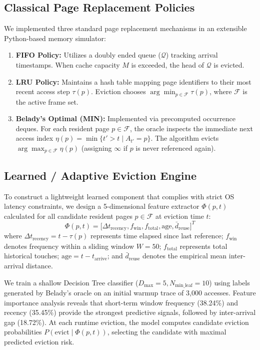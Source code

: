 \documentclass[10pt,twocolumn,a4paper]{article}
\begin{document}
\subsection{Classical Page Replacement Policies}
We implemented three standard page replacement mechanisms in an extensible Python-based memory simulator:
\begin{enumerate}
    \item \textbf{FIFO Policy:} Utilizes a doubly ended queue ($\mathcal{Q}$) tracking arrival timestamps. When cache capacity $M$ is exceeded, the head of $\mathcal{Q}$ is evicted.
    \item \textbf{LRU Policy:} Maintains a hash table mapping page identifiers to their most recent access step $\tau(p)$. Eviction chooses $\arg\min_{p \in \mathcal{F}} \tau(p)$, where $\mathcal{F}$ is the active frame set.
    \item \textbf{Belady's Optimal (MIN):} Implemented via precomputed occurrence deques. For each resident page $p \in \mathcal{F}$, the oracle inspects the immediate next access index $\eta(p) = \min \{t' > t \mid A_{t'} = p\}$. The algorithm evicts $\arg\max_{p \in \mathcal{F}} \eta(p)$ (assigning $\infty$ if $p$ is never referenced again).
\end{enumerate}

\subsection{Learned / Adaptive Eviction Engine}
To construct a lightweight learned component that complies with strict OS latency constraints, we design a 5-dimensional feature extractor $\Phi(p, t)$ calculated for all candidate resident pages $p \in \mathcal{F}$ at eviction time $t$:
\begin{equation}
\Phi(p, t) = \big[ \Delta t_{\text{recency}}, f_{\text{win}}, f_{\text{total}}, \text{age}, \bar{d}_{\text{reuse}} \big]^T
\end{equation}
where $\Delta t_{\text{recency}} = t - \tau(p)$ represents time elapsed since last reference; $f_{\text{win}}$ denotes frequency within a sliding window $W = 50$; $f_{\text{total}}$ represents total historical touches; $\text{age} = t - t_{\text{arrive}}$; and $\bar{d}_{\text{reuse}}$ denotes the empirical mean inter-arrival distance.

We train a shallow Decision Tree classifier ($D_{\max} = 5, N_{\text{min\_leaf}} = 10$) using labels generated by Belady's oracle on an initial warmup trace of 3,000 accesses. Feature importance analysis reveals that short-term window frequency (38.24\%) and recency (35.45\%) provide the strongest predictive signals, followed by inter-arrival gap (18.72\%). At each runtime eviction, the model computes candidate eviction probabilities $P(\text{evict} \mid \Phi(p, t))$, selecting the candidate with maximal predicted eviction risk.
\end{document}
